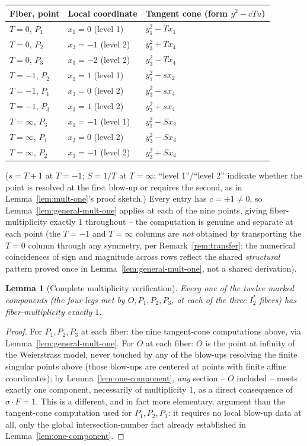 \documentclass[11pt]{amsart}
\newtheorem{lemma}[theorem]{Lemma}
\theoremstyle{definition}
\begin{document}
\begin{center}
\begin{tabular}{l|l|l}
Fiber, point & Local coordinate & Tangent cone (form $y^2-cTu$)\\\hline
$T=0$, $P_1$ & $x_1=0$ (level 1) & $y_1^2-Tx_1$ \\
$T=0$, $P_2$ & $x_3=-1$ (level 2) & $y_3^2+Tx_4$ \\
$T=0$, $P_3$ & $x_3=-2$ (level 2) & $y_3^2-Tx_4$ \\
$T=-1$, $P_2$ & $x_1=1$ (level 1) & $y_1^2-sx_2$ \\
$T=-1$, $P_1$ & $x_3=0$ (level 2) & $y_3^2-sx_4$ \\
$T=-1$, $P_3$ & $x_3=1$ (level 2) & $y_3^2+sx_4$ \\
$T=\infty$, $P_3$ & $x_1=-1$ (level 1) & $y_1^2-Sx_2$ \\
$T=\infty$, $P_1$ & $x_3=0$ (level 2) & $y_3^2-Sx_4$ \\
$T=\infty$, $P_2$ & $x_3=-1$ (level 2) & $y_3^2+Sx_4$ \\
\end{tabular}
\end{center}
($s=T+1$ at $T=-1$; $S=1/T$ at $T=\infty$; ``level 1''/``level 2''
indicate whether the point is resolved at the first blow-up or requires
the second, as in Lemma~\ref{lem:mult-one}'s proof sketch.) Every entry
has $c=\pm1\neq0$, so Lemma~\ref{lem:general-mult-one} applies at each of
the nine points, giving fiber-multiplicity exactly $1$ throughout -- the
computation is genuine and separate at each point (the $T=-1$ and
$T=\infty$ columns are \emph{not} obtained by transporting the $T=0$
column through any symmetry, per Remark~\ref{rem:transfer}; the numerical
coincidences of sign and magnitude across rows reflect the shared
\emph{structural} pattern proved once in Lemma~\ref{lem:general-mult-one},
not a shared derivation).

\begin{lemma}[Complete multiplicity verification]
\label{lem:mult-all}
Every one of the twelve marked components (the four legs met by
$O,P_1,P_2,P_3$, at each of the three $I_2^*$ fibers) has
fiber-multiplicity exactly $1$.
\end{lemma}

\begin{proof}
For $P_1,P_2,P_3$ at each fiber: the nine tangent-cone computations above,
via Lemma~\ref{lem:general-mult-one}. For $O$ at each fiber: $O$ is the
point at infinity of the Weierstrass model, never touched by any of the
blow-ups resolving the finite singular points above (those blow-ups are
centered at points with finite affine coordinates); by
Lemma~\ref{lem:one-component}, \emph{any} section -- $O$ included -- meets
exactly one component, necessarily of multiplicity $1$, as a direct
consequence of $\sigma\cdot F=1$. This is a different, and in fact more
elementary, argument than the tangent-cone computation used for
$P_1,P_2,P_3$: it requires no local blow-up data at all, only the global
intersection-number fact already established in Lemma~\ref{lem:one-component}.
\end{proof}
\end{document}
